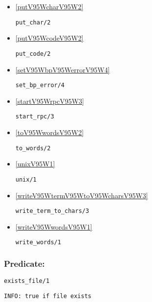 \begin{itemize}
\item \ref{putV95WcharV95W2} 
\begin{verbatim}
put_char/2
\end{verbatim}

\item \ref{putV95WcodeV95W2} 
\begin{verbatim}
put_code/2
\end{verbatim}

\item \ref{setV95WbpV95WerrorV95W4} 
\begin{verbatim}
set_bp_error/4
\end{verbatim}

\item \ref{startV95WrpcV95W3} 
\begin{verbatim}
start_rpc/3
\end{verbatim}

\item \ref{toV95WwordsV95W2} 
\begin{verbatim}
to_words/2
\end{verbatim}

\item \ref{unixV95W1} 
\begin{verbatim}
unix/1
\end{verbatim}

\item \ref{writeV95WtermV95WtoV95WcharsV95W3} 
\begin{verbatim}
write_term_to_chars/3
\end{verbatim}

\item \ref{writeV95WwordsV95W1} 
\begin{verbatim}
write_words/1
\end{verbatim}

\end{itemize}

\subsubsection{Predicate:} \label{existsV95WfileV95W1}

\begin{verbatim}
exists_file/1
\end{verbatim}

{\small \begin{verbatim}
INFO: true if file exists

\end{verbatim}}
